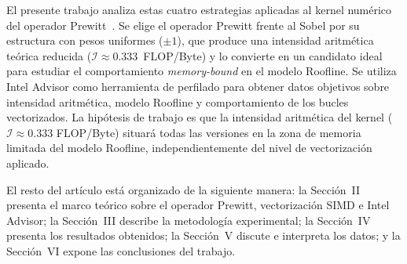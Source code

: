 El presente trabajo analiza estas cuatro estrategias aplicadas
al kernel num\'erico del operador Prewitt~\cite{gonzalez2008,prewitt1970}.
Se elige el operador Prewitt frente al Sobel por su estructura
con pesos uniformes ($\pm 1$), que produce una intensidad
aritm\'etica te\'orica reducida ($\mathcal{I} \approx 0.333$~FLOP/Byte)
y lo convierte en un candidato ideal para estudiar el
comportamiento \textit{memory-bound} en el modelo Roofline.
Se utiliza Intel Advisor como herramienta de perfilado para
obtener datos objetivos sobre intensidad aritm\'etica, modelo
Roofline y comportamiento de los bucles vectorizados.
La hip\'otesis de trabajo es que la intensidad aritm\'etica del
kernel ($\mathcal{I} \approx 0.333$ FLOP/Byte) situar\'a todas
las versiones en la zona de memoria limitada del modelo Roofline,
independientemente del nivel de vectorizaci\'on aplicado.

El resto del art\'iculo est\'a organizado de la siguiente manera:
la Secci\'on~II presenta el marco te\'orico sobre el operador
Prewitt, vectorizaci\'on SIMD e Intel Advisor;
la Secci\'on~III describe la metodolog\'ia experimental;
la Secci\'on~IV presenta los resultados obtenidos;
la Secci\'on~V discute e interpreta los datos;
y la Secci\'on~VI expone las conclusiones del trabajo.
